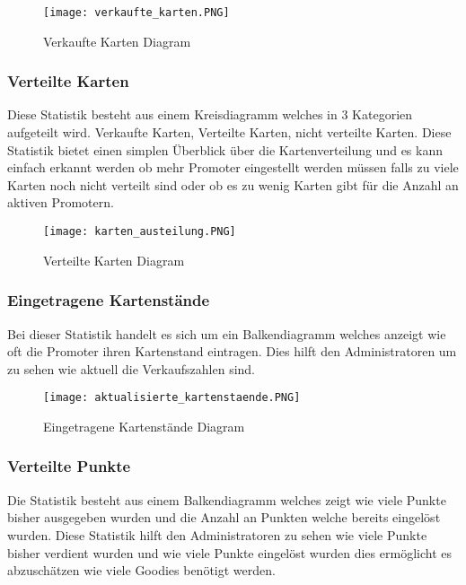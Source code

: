 				\begin{figure}[H]
					\centering
					\texttt{[image: verkaufte\_karten.PNG]}
					\caption{Verkaufte Karten Diagram}
				\end{figure}

			\subsubsection{Verteilte Karten}
				Diese Statistik besteht aus einem Kreisdiagramm welches in 3 Kategorien aufgeteilt wird. Verkaufte Karten, Verteilte Karten, nicht verteilte Karten. Diese Statistik bietet einen simplen Überblick über die Kartenverteilung und es kann einfach erkannt werden ob mehr Promoter eingestellt werden müssen falls zu viele Karten noch nicht verteilt sind oder ob es zu wenig Karten gibt für die Anzahl an aktiven Promotern. 
				
				\begin{figure}[H]
					\centering
					\texttt{[image: karten\_austeilung.PNG]}
					\caption{Verteilte Karten Diagram}
				\end{figure}

			\subsubsection{Eingetragene Kartenstände}
				Bei dieser Statistik handelt es sich um ein Balkendiagramm welches anzeigt wie oft die Promoter ihren Kartenstand eintragen. Dies hilft den Administratoren um zu sehen wie aktuell die Verkaufszahlen sind.
				
				\begin{figure}[H]
					\centering
					\texttt{[image: aktualisierte\_kartenstaende.PNG]}
					\caption{Eingetragene Kartenstände Diagram}
				\end{figure}

			\subsubsection{Verteilte Punkte}
				Die Statistik besteht aus einem Balkendiagramm welches zeigt wie viele Punkte bisher ausgegeben wurden und die Anzahl an Punkten welche bereits eingelöst wurden. Diese Statistik hilft den Administratoren zu sehen wie viele Punkte bisher verdient wurden und wie viele Punkte eingelöst wurden dies ermöglicht es abzuschätzen wie viele Goodies benötigt werden. 
				
